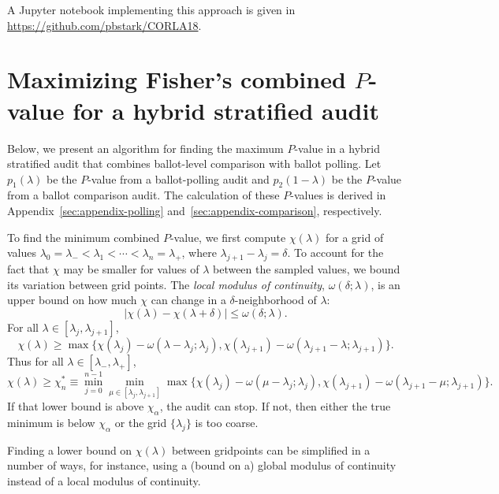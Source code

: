 \documentclass[runningheads]{llncs}
\begin{document}
A Jupyter notebook implementing this approach is given in \url{https://github.com/pbstark/CORLA18}.



\section{Maximizing Fisher's combined $P$-value for a hybrid stratified audit}\label{sec:appendix-max-fisher}

Below, we present an algorithm for finding the maximum $P$-value in a hybrid stratified audit that combines
ballot-level comparison with ballot polling.
Let $p_1(\lambda)$ be the $P$-value from a ballot-polling audit and $p_2(1-\lambda)$ be the
$P$-value from a ballot comparison audit.
The calculation of these $P$-values is derived in Appendix~\ref{sec:appendix-polling} 
and~\ref{sec:appendix-comparison}, respectively.

To find the minimum combined $P$-value, we first compute $\chi(\lambda)$ 
for a grid of values $\lambda_0 = \lambda_- < \lambda_1 < \cdots < \lambda_n = \lambda_+$,
where $\lambda_{j+1} - \lambda_j = \delta$.
To account for the fact that $\chi$ may be smaller for values of $\lambda$ between the 
sampled values, we bound its variation between grid points.
The \emph{local modulus of continuity}, $\omega(\delta; \lambda)$, is an upper bound on how much $\chi$ can change in a $\delta$-neighborhood of $\lambda$:
$$\lvert \chi(\lambda) - \chi(\lambda + \delta) \rvert \leq \omega(\delta; \lambda).$$
For all $\lambda \in [\lambda_j, \lambda_{j+1}]$, 
\begin{equation}
    \chi(\lambda) \ge \max \{ \chi(\lambda_j) - \omega(\lambda-\lambda_j; \lambda_j), 
                                            \chi(\lambda_{j+1}) - \omega(\lambda_{j+1}-\lambda; \lambda_{j+1}) \}.
\end{equation}
Thus for all $\lambda \in [\lambda_-, \lambda_+]$,
\begin{equation}
    \chi(\lambda) \ge \chi^*_n \equiv \min_{j=0}^{n-1} \min_{\mu \in [\lambda_j, \lambda_{j+1}]}
                 \max \{ \chi(\lambda_j) - \omega(\mu-\lambda_j; \lambda_j), 
                                            \chi(\lambda_{j+1}) - \omega(\lambda_{j+1}-\mu; \lambda_{j+1}) \}.
\end{equation}
If that lower bound is above $\chi_\alpha$, the audit can stop.
If not, then either the true minimum is below $\chi_\alpha$ or the grid $\{\lambda_j \}$ is too coarse.

Finding a lower bound on $\chi(\lambda)$ between gridpoints can be simplified in a number of ways, for instance, using a (bound on a) global modulus of continuity instead of a local modulus of continuity.
\end{document}
